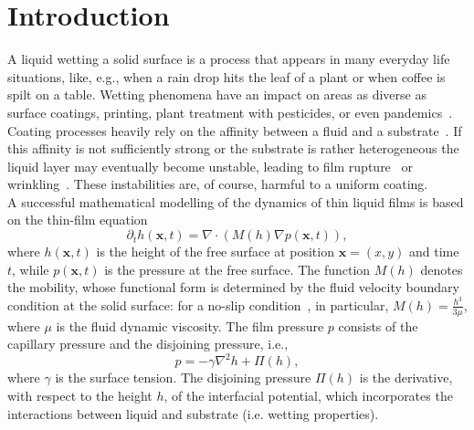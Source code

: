 \section{Introduction}\label{sec:intro}
A liquid wetting a solid surface is a process that appears in many everyday life situations, like, e.g., when a rain drop hits the leaf of a plant or when coffee is spilt on a table.
Wetting phenomena have an impact on areas as diverse as surface coatings, printing, plant treatment with pesticides, or even pandemics~\cite{oronLongscaleEvolutionThin1997, snoeijerMovingContactLines2013, cassieWettabilityPorousSurfaces1944, lenormandLiquidsPorousMedia1990,deryckGravityInertiaEffects1998, quereFluidCoatingFiber1999,bergeronControllingDropletDeposition2000,bhardwajLikelihoodSurvivalCoronavirus2020}.
Coating processes heavily rely on the affinity between a fluid and a substrate~\cite{bonnWettingSpreading2009}.
If this affinity is not sufficiently strong or the substrate is rather heterogeneous the liquid layer may eventually become unstable, leading to film rupture~\cite{oronLongscaleEvolutionThin1997, crasterDynamicsStabilityThin2009} or wrinkling~\cite{dasilvasobrinhoStudyDefectsUltrathin1999}. 
These instabilities are, of course, harmful to a uniform coating.\\ 
A successful mathematical modelling of the dynamics of thin liquid films is based on the thin-film equation~\cite{reynoldsIIIExperimentalInvestigation1883, oronLongscaleEvolutionThin1997}
\begin{equation}\label{eq:thin_film}
    \partial_t h(\mathbf{x},t) = \nabla\cdot\left(M(h)\nabla p(\mathbf{x},t)\right),
\end{equation}
where $h(\mathbf{x},t)$ is the height of the free surface at position $\mathbf{x} = (x,y)$ and time $t$, while $p(\mathbf{x},t)$ is the pressure at the free surface.
The function $M(h)$ denotes the mobility, whose functional form is determined by the fluid velocity boundary condition at the solid surface: for a no-slip condition~\cite{oronLongscaleEvolutionThin1997}, in particular, $M(h)=\frac{h^3}{3\mu}$, where $\mu$ is the fluid dynamic viscosity.
The film pressure $p$ consists of the capillary pressure and the disjoining pressure, i.e.,
\begin{equation}\label{eq:pressure}
    p = - \gamma\nabla^2 h + \Pi(h),
\end{equation}
where $\gamma$ is the surface tension. The disjoining pressure $\Pi(h)$ is the derivative, with respect to the height $h$, of the interfacial potential, which incorporates the interactions between liquid and substrate (i.e. wetting properties).
